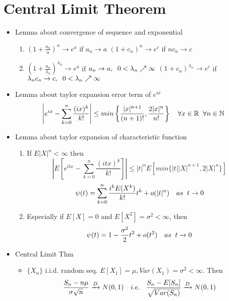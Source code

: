 \documentclass[12pt, A4]{article}
\begin{document}
\section{Central Limit Theorem}
\begin{itemize}
	\item Lemma about convergence of sequence and exponential
	\begin{enumerate}
		\item $(1+\frac{a_n}{n})^n \rightarrow e^a$ if $a_n\rightarrow a$
		\quad $(1+c_n)^n \rightarrow e^c$ if $nc_n\rightarrow c$
		\item $(1+\frac{a_n}{\lambda_n})^{\lambda_n} \rightarrow e^a$ if $a_n\rightarrow a, \hspace{0.2cm} 0<\lambda_n \nearrow \infty$
		\newline $(1+c_n)^{\lambda_n}\rightarrow e^c$ if $\lambda_nc_n\rightarrow c, \hspace{0.2cm} 0<\lambda_n\nearrow \infty$
	\end{enumerate}
	\item Lemma about taylor expansion error term of $e^{ix}$
	$$\left|e^{ix}-\sum_{k=0}^{n}\frac{(ix)^k}{k!}\right|\leq min\left\{\frac{|x|^{n+1}}{(n+1)!}, \frac{2|x|^n}{n!}\right\}\quad \forall x\in\mathbb{R} \hspace{0.2cm} \forall n\in \mathbb{N}$$
	\item Lemma about taylor expansion of characteristic function
	\begin{enumerate}
		\item If $E|X|^n<\infty$ then $$\left|E\left[e^{itx}-\sum_{k=0}^{n}\frac{(itx)^k}{k!}\right]\right|\leq|t|^nE[min\{|t||X|^{n+1}, 2|X|^n\}]$$
		$$\psi(t)=\sum_{k=0}^{n}\frac{i^kE(X^k)}{k!}t^k+o(|t|^n)\quad as\hspace{0.2cm} t\rightarrow 0$$
		\item Especially if $E[X]=0$ and $E[X^2]=\sigma^2<\infty$, then
		$$\psi(t)=1-\frac{\sigma^2}{2} t^2 + o(t^2) \quad as\hspace{0.2cm} t\rightarrow 0$$
	\end{enumerate}
	\item Central Limit Thm
	\begin{itemize}
		\item $\{X_n\}$ i.i.d. random seq. $E[X_1]=\mu, Var(X_1)=\sigma^2<\infty$. Then $$\frac{S_n-n\mu}{\sigma\sqrt{n}}\xrightarrow{D}N(0,1)\quad i.e.\hspace{0.3cm} \frac{S_n-E[S_n]}{\sqrt{Var(S_n)}}\xrightarrow{D}N(0,1)$$
	\end{itemize}

\end{itemize}
\end{document}
